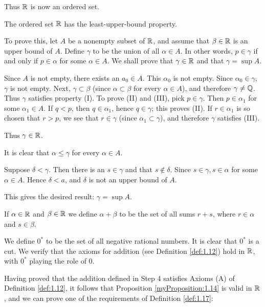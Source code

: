 Thus ${\protect\mathbb R}$ is now an ordered set.


The ordered set ${\protect\mathbb R}$ has the least-upper-bound property.

To prove this, let $A$ be a nonempty subset of ${\protect\mathbb R}$, 
and assume that $\beta \in {\protect\mathbb R}$ is an upper bound of $A$. 
Define $\gamma$ to be the union of all $\alpha \in A$. 
In other words, $p \in \gamma$ if and only if $p \in \alpha$ for some $\alpha \in A$. 
We shall prove that $\gamma \in {\protect\mathbb R}$ and that $\gamma = \sup A$.

Since $A$ is not empty, there exists an $a_0 \in A$. 
This $\alpha_0$ is not empty. 
Since $\alpha_0 \in \gamma$, $\gamma$ is not empty. 
Next, $\gamma \subset \beta$ 
(since $\alpha \subset \beta$ for every $\alpha \in A$), 
and therefore $\gamma \neq {\protect\mathbb Q}$. 
Thus $\gamma$ satisfies property (I). 
To prove (II) and (III), pick $p \in \gamma$. 
Then $p \in \alpha_1$ for some $\alpha_1 \in A$. 
If $q <p$, then $q \in \alpha_1$, hence $q \in \gamma$; this proves (II). 
If $r \in \alpha_1$ is so chosen that $r > p$, 
we see that $r\in \gamma$ (since $\alpha_1 \subset \gamma$), 
and therefore $\gamma$ satisfies (III).

Thus $\gamma \in {\protect\mathbb R}$.

It is clear that $\alpha \leq \gamma$ for every $\alpha \in A$.

Suppose $\delta < \gamma$. 
Then there is an $s \in \gamma$ and that $s \not\in \delta$. 
Since $s \in \gamma, s \in \alpha$ for some $\alpha \in A$. 
Hence $\delta <a$, and $\delta$ is not an upper bound of $A$.

This gives the desired result: $\gamma = \sup A$.


If $\alpha \in {\protect\mathbb R}$ and $\beta \in {\protect\mathbb R}$ 
we define $\alpha + \beta$ to be the set of all sums $r + s$, 
where $r \in \alpha$ and $s \in \beta$.

We define $0^*$ to be the set of all negative rational numbers. 
It is clear that $0^*$ is a cut. 
We verify that the axioms for addition 
(see Definition \ref{def:1.12}) 
hold in ${\protect\mathbb R}$, with $0^*$ playing the role of $0$.

Having proved that the addition defined in Step 4 satisfies Axioms (A) of Definition \ref{def:1.12}, 
it follows that Proposition \ref{myProposition:1.14} is valid in ${\protect\mathbb R}$, and we can
prove one of the requirements of Definition \ref{def:1.17}:

